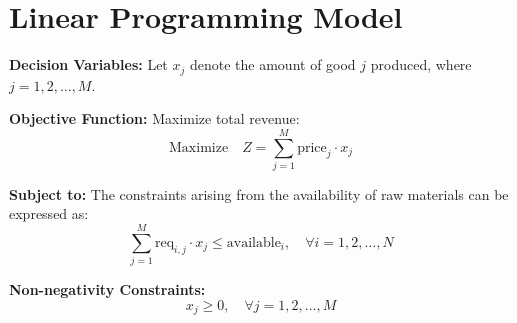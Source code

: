 \documentclass{article}
\begin{document}
\section*{Linear Programming Model}

\textbf{Decision Variables:}
Let \( x_j \) denote the amount of good \( j \) produced, where \( j = 1, 2, \ldots, M \).

\textbf{Objective Function:}
Maximize total revenue:
\[
\text{Maximize} \quad Z = \sum_{j=1}^{M} \text{price}_j \cdot x_j
\]

\textbf{Subject to:}
The constraints arising from the availability of raw materials can be expressed as:
\[
\sum_{j=1}^{M} \text{req}_{i,j} \cdot x_j \leq \text{available}_{i}, \quad \forall i = 1, 2, \ldots, N
\]

\textbf{Non-negativity Constraints:}
\[
x_j \geq 0, \quad \forall j = 1, 2, \ldots, M
\]
\end{document}

